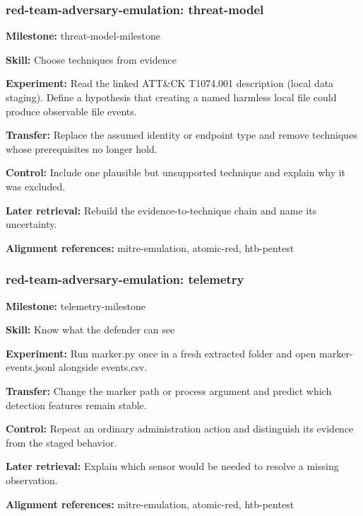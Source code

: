 \subsubsection{red-team-adversary-emulation: threat-model}
\noindent\textbf{Milestone:} threat-model-milestone\par
\noindent\textbf{Skill:} Choose techniques from evidence\par
\noindent\textbf{Experiment:} Read the linked ATT\&CK T1074.001 description (local data staging). Define a hypothesis that creating a named harmless local file could produce observable file events.\par
\noindent\textbf{Transfer:} Replace the assumed identity or endpoint type and remove techniques whose prerequisites no longer hold.\par
\noindent\textbf{Control:} Include one plausible but unsupported technique and explain why it was excluded.\par
\noindent\textbf{Later retrieval:} Rebuild the evidence-to-technique chain and name its uncertainty.\par
\noindent\textbf{Alignment references:} mitre-emulation, atomic-red, htb-pentest\par
\subsubsection{red-team-adversary-emulation: telemetry}
\noindent\textbf{Milestone:} telemetry-milestone\par
\noindent\textbf{Skill:} Know what the defender can see\par
\noindent\textbf{Experiment:} Run marker.py once in a fresh extracted folder and open marker-events.jsonl alongside events.csv.\par
\noindent\textbf{Transfer:} Change the marker path or process argument and predict which detection features remain stable.\par
\noindent\textbf{Control:} Repeat an ordinary administration action and distinguish its evidence from the staged behavior.\par
\noindent\textbf{Later retrieval:} Explain which sensor would be needed to resolve a missing observation.\par
\noindent\textbf{Alignment references:} mitre-emulation, atomic-red, htb-pentest\par
